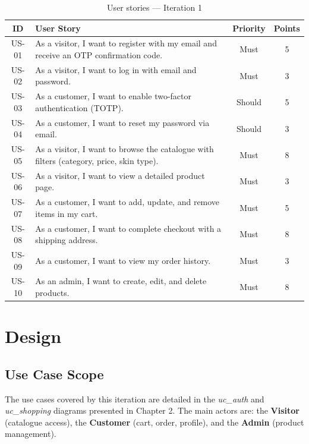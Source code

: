 \begin{table}[H]
\centering
\caption{User stories --- Iteration 1}
\begin{tabularx}{\textwidth}{|c|X|c|c|}
\hline
\rowcolor{gray!20}
\textbf{ID} & \textbf{User Story} & \textbf{Priority} & \textbf{Points} \\
\hline
US-01 & As a visitor, I want to register with my email and receive an OTP confirmation code. & Must & 5 \\
\hline
US-02 & As a visitor, I want to log in with email and password. & Must & 3 \\
\hline
US-03 & As a customer, I want to enable two-factor authentication (TOTP). & Should & 5 \\
\hline
US-04 & As a customer, I want to reset my password via email. & Should & 3 \\
\hline
US-05 & As a visitor, I want to browse the catalogue with filters (category, price, skin type). & Must & 8 \\
\hline
US-06 & As a visitor, I want to view a detailed product page. & Must & 3 \\
\hline
US-07 & As a customer, I want to add, update, and remove items in my cart. & Must & 5 \\
\hline
US-08 & As a customer, I want to complete checkout with a shipping address. & Must & 8 \\
\hline
US-09 & As a customer, I want to view my order history. & Must & 3 \\
\hline
US-10 & As an admin, I want to create, edit, and delete products. & Must & 8 \\
\hline
\end{tabularx}
\end{table}

\section{Design}

\subsection{Use Case Scope}

The use cases covered by this iteration are detailed in the \textit{uc\_auth}
and \textit{uc\_shopping} diagrams presented in Chapter 2.
The main actors are: the \textbf{Visitor} (catalogue access),
the \textbf{Customer} (cart, order, profile), and the \textbf{Admin}
(product management).

